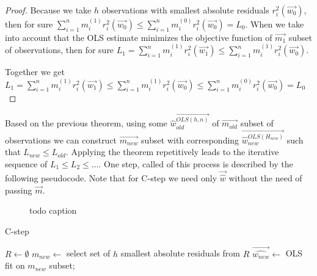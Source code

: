 \begin{proof}
    Because we take $h$ observations with smallest absolute residuals $r_{i}^2(\vec{w_0})$, then for sure
$\sum\limits_{i=1}^n m^{(1)}_i r_{i}^2(\vec{w_0})
\leq
\sum\limits_{i=1}^n m^{(0)}_i r_{i}^2(\vec{w_0}) =  L_0
$.
When we take into account that the OLS estimate minimizes the objective function of $\vec{m_1}$ subset of observations, then for sure  
$L_1 =  \sum\limits_{i=1}^n m^{(1)}_i r_{i}^2(\vec{w_1})
 \leq 
\sum\limits_{i=1}^n m^{(1)}_i r_{i}^2(\vec{w_0})$.

Together we get 
$
L_1 = \sum\limits_{i=1}^n m^{(1)}_i r_{i}^2(\vec{w_1})
\leq
\sum\limits_{i=1}^n m^{(1)}_i r_{i}^2(\vec{w_0})
\leq
\sum\limits_{i=1}^n m^{(0)}_i r_{i}^2(\vec{w_0}) =  L_0
$
\end{proof}


\begin{corollary} 
    Based on the previous theorem, using some $\vec{\hat{w}_{old}^{OLS(h, n)}}$  of $\vec{m_{old}}$ subset of observations we can construct $\vec{m_{new}}$ subset with corresponding $\vec{\hat{w}_{new}^{OLS(H_{new})}}$ such that $L_{new} \leq L_{old}$. 
    Applying the theorem repetitively leads to the iterative sequence of
    $L_{1} \leq L_{2} \leq \ldots$. One step, called  of this process is described by the following pseudocode. Note that for C-step we  need only $\vec{\hat{w}}$ 
     without the need of passing  $\vec{m}$.
\end{corollary}

\begin{figure}[h]
\centering
{}
\caption{todo caption}
\label{figure:one:c:step}
\end{figure}

\begin{algorithm}[H]
    \label{alg:Cstep}
    \caption{C-step}
    
    $R \gets \emptyset$\;
    $m_{new} \gets $ select set of $h$ smallest absolute residuals from $R$\;
    $\vec{\hat{w_{new}}} \gets$ OLS fit on $m_{new}$ subset;
    \;
\end{algorithm}

